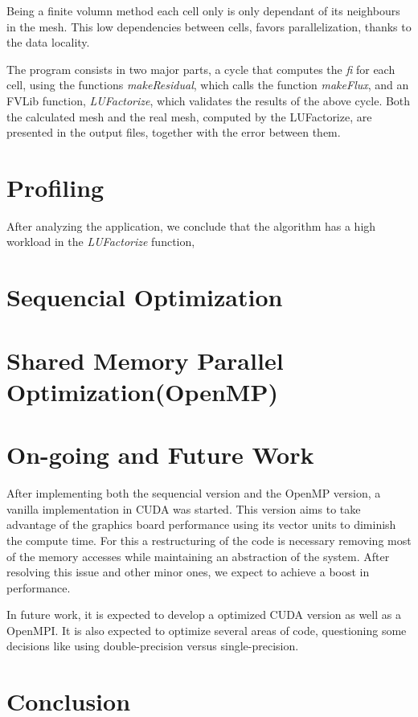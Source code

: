 \documentclass[a4paper,10pt,openright,openbib,twocolumn]{article}
\begin{document}
Being a finite volumn method each cell only is only dependant of its neighbours in the mesh. This low dependencies between cells, favors parallelization, thanks to the data locality.

The program consists in two major parts, a cycle that computes the \emph{fi} for each cell, using the functions \emph{makeResidual}, which calls the function \emph{makeFlux}, and an FVLib function, \emph{LUFactorize}, which validates the results of the above cycle. Both the calculated mesh and the real mesh, computed by the LUFactorize, are presented in the output files, together with the error between them.

\section{Profiling}
 
 After analyzing the application, we conclude that the algorithm has a high workload in the \emph{LUFactorize} function,


\section{Sequencial Optimization}


\section{Shared Memory Parallel Optimization(OpenMP)}



\section{On-going and Future Work}

After implementing both the sequencial version and the OpenMP version, a vanilla implementation in CUDA was started. This version aims to take advantage of the graphics board performance using its vector units to diminish the compute time. For this a restructuring of the code is necessary removing most of the memory accesses while maintaining an abstraction of the system. After resolving this issue and other minor ones, we expect to achieve a boost in performance.

In future work, it is expected to develop a optimized CUDA version as well as a OpenMPI. It is also expected to optimize several areas of code, questioning some decisions like using double-precision versus single-precision.

\section{Conclusion}
\end{document}
